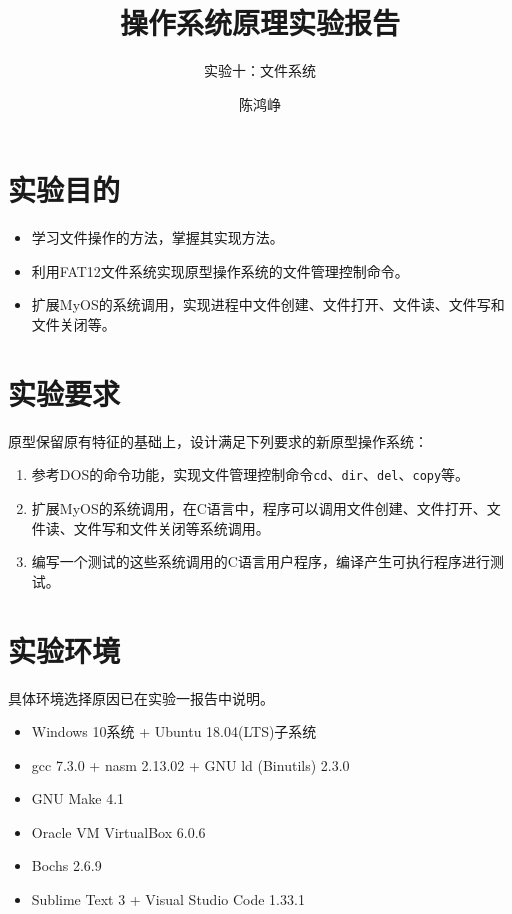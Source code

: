 \documentclass[logo,reportComp]{thesis}
\title{操作系统原理实验报告}
\subtitle{实验十：文件系统}
\author{陈鸿峥}
\begin{document}
\maketitle

\section{实验目的}
\begin{itemize}
	\item 学习文件操作的方法，掌握其实现方法。
	\item 利用FAT12文件系统实现原型操作系统的文件管理控制命令。
	\item 扩展MyOS的系统调用，实现进程中文件创建、文件打开、文件读、文件写和文件关闭等。
\end{itemize}

\section{实验要求}
原型保留原有特征的基础上，设计满足下列要求的新原型操作系统：
\begin{enumerate}
\item 参考DOS的命令功能，实现文件管理控制命令\verb'cd'、\verb'dir'、\verb'del'、\verb'copy'等。
\item 扩展MyOS的系统调用，在C语言中，程序可以调用文件创建、文件打开、文件读、文件写和文件关闭等系统调用。
\item 编写一个测试的这些系统调用的C语言用户程序，编译产生可执行程序进行测试。
\end{enumerate}

\section{实验环境}
具体环境选择原因已在实验一报告中说明。
\begin{itemize}
	\item Windows 10系统 + Ubuntu 18.04(LTS)子系统
	\item gcc 7.3.0 + nasm 2.13.02 + GNU ld (Binutils) 2.3.0
	\item GNU Make 4.1
	\item Oracle VM VirtualBox 6.0.6
	\item Bochs 2.6.9
	\item Sublime Text 3 + Visual Studio Code 1.33.1
\end{itemize}
\end{document}
